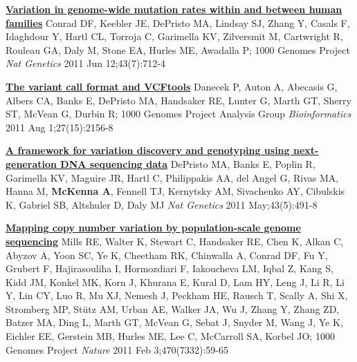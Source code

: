 \documentclass[9pt]{article}
\begin{document}
\noindent\href{https://www.ncbi.nlm.nih.gov/pubmed/21666693}{\bf  Variation in genome-wide mutation rates within and between human families}\vspace{-0.03in}
\newline\noindent Conrad DF, Keebler JE, DePristo MA, Lindsay SJ, Zhang Y, Casals F, Idaghdour  Y, Hartl CL, Torroja C, Garimella KV, Zilversmit M, Cartwright R, Rouleau GA, Daly M, Stone EA, Hurles ME, Awadalla P; 1000 Genomes Project
\newline\noindent\emph{ Nat Genetics} 2011 Jun 12;43(7):712-4
\bigskip

\noindent\href{https://www.ncbi.nlm.nih.gov/pubmed/21653522}{\bf  The variant call format and VCFtools}\vspace{-0.03in}
\newline\noindent Danecek P, Auton A, Abecasis G, Albers CA, Banks E, DePristo MA, Handsaker RE, Lunter G, Marth GT, Sherry ST, McVean G, Durbin R; 1000 Genomes Project Analysis Group
\newline\noindent\emph{ Bioinformatics} 2011 Aug 1;27(15):2156-8
\bigskip

\noindent\href{https://www.ncbi.nlm.nih.gov/pubmed/None}{\bf  A framework for variation discovery and genotyping using next-generation DNA sequencing data}\vspace{-0.03in}
\newline\noindent DePristo MA, Banks E, Poplin R, Garimella KV, Maguire JR, Hartl C, Philippakis AA, del Angel G, Rivas MA, Hanna M, \textbf{McKenna A}, Fennell TJ, Kernytsky  AM, Sivachenko AY, Cibulskis K, Gabriel SB, Altshuler D, Daly MJ
\newline\noindent\emph{ Nat Genetics} 2011 May;43(5):491-8
\bigskip

\noindent\href{https://www.ncbi.nlm.nih.gov/pubmed/21293372}{\bf  Mapping copy number variation by population-scale genome sequencing}\vspace{-0.03in}
\newline\noindent Mills RE, Walter K, Stewart C, Handsaker RE, Chen K, Alkan C, Abyzov A, Yoon  SC, Ye K, Cheetham RK, Chinwalla A, Conrad DF, Fu Y, Grubert F, Hajirasouliha I,  Hormozdiari F, Iakoucheva LM, Iqbal Z, Kang S, Kidd JM, Konkel MK, Korn J, Khurana E, Kural D, Lam HY, Leng J, Li R, Li Y, Lin CY, Luo R, Mu XJ, Nemesh J, Peckham HE, Rausch T, Scally A, Shi X, Stromberg MP, Stütz AM, Urban AE, Walker JA, Wu J, Zhang Y, Zhang ZD, Batzer MA, Ding L, Marth GT, McVean G, Sebat J, Snyder M, Wang J, Ye K, Eichler EE, Gerstein MB, Hurles ME, Lee C, McCarroll SA,  Korbel JO; 1000 Genomes Project
\newline\noindent\emph{ Nature} 2011 Feb 3;470(7332):59-65
\bigskip
\end{document}
